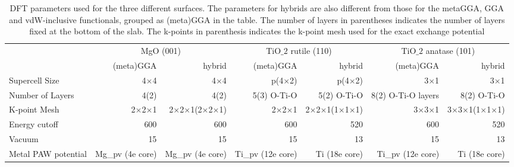 \begin{table}
\caption{\label{tab:dft_parameters}DFT parameters used for the three different surfaces. The parameters for hybrids are also different from those for the metaGGA, GGA and vdW-inclusive functionals, grouped as (meta)GGA in the table. The number of layers in parentheses indicates the number of layers fixed at the bottom of the slab. The k-points in parenthesis indicates the k-point mesh used for the exact exchange potential}
\begin{adjustbox}{max width=1\textwidth}
\begin{tabular}{lrrrrrr}
\toprule
 & \multicolumn{2}{c}{MgO (001)} & \multicolumn{2}{c}{TiO$\_2$ rutile (110)} & \multicolumn{2}{c}{TiO$\_2$ anatase (101)} \\ \cmidrule(lr){2-3}  \cmidrule(lr){4-5} \cmidrule(lr){6-7}
 & (meta)GGA & hybrid & (meta)GGA & hybrid & (meta)GGA & hybrid \\
\midrule
Supercell Size & 4${\times}$4 & 4${\times}$4 & p(4${\times}$2) & p(4${\times}$2) & 3${\times}$1 & 3${\times}$1 \\
Number of Layers & 4(2) & 4(2) & 5(3) O-Ti-O & 5(2) O-Ti-O & 8(2) O-Ti-O layers & 8(2) O-Ti-O \\
K-point Mesh & 2${\times}$2${\times}$1 & 2${\times}$2${\times}$1(2${\times}$2${\times}$1) & 2${\times}$2${\times}$1 & 2${\times}$2${\times}$1(1${\times}$1${\times}$1) & 3${\times}$3${\times}$1 & 3${\times}$3${\times}$1(1${\times}$1${\times}$1) \\
Energy cutoff & 600 & 600 & 600 & 520 & 600 & 520 \\
Vacuum & 15 & 15 & 15 & 13 & 15 & 13 \\
Metal PAW potential & Mg\_pv (4e core) & Mg\_pv (4e core) & Ti\_pv (12e core) & Ti (18e core) & Ti\_pv (12e core) & Ti (18e core) \\
\bottomrule
\end{tabular}
\end{adjustbox}
\end{table}